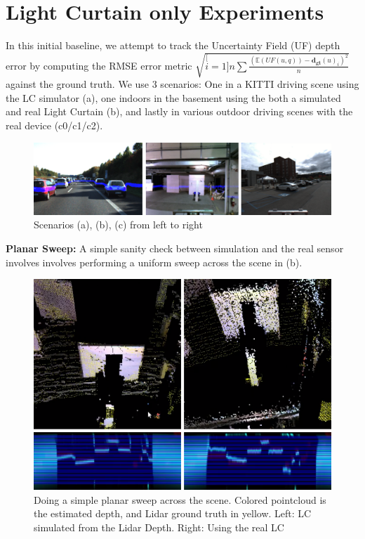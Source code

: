 
\section{Light Curtain only Experiments}

In this initial baseline, we attempt to track the Uncertainty Field (UF) depth error by computing the RMSE error metric $\sqrt{\stackrel[i=1]{n}{\sum}\frac{\left(\mathbb{E}\left(UF\left(u,q\right)\right)-\mathbf{d_{gt}}(u)_{i}\right)^{2}}{n}}$ against the ground truth. We use 3 scenarios: One in a KITTI driving scene using the LC simulator (a), one indoors in the basement using the both a simulated and real Light Curtain (b), and lastly in various outdoor driving scenes with the real device (c0/c1/c2). 

\begin{figure}[h]
   \centering
   \begin{minipage}{0.5\textwidth}
       \centering
       \includegraphics[width=1.0\textwidth]{figures/exp.png}
   \end{minipage}\hfill
   \centering
   \caption{Scenarios (a), (b), (c) from left to right}
   \label{fig:exp}
\end{figure}

\textbf{Planar Sweep:} A simple sanity check between simulation and the real sensor involves involves performing a uniform sweep across the scene in (b). 

\begin{figure}
   \centering
   \begin{minipage}{0.4\textwidth}
       \centering
       \includegraphics[width=1.0\textwidth]{figures/sweep.png}
   \end{minipage}\hfill
   \centering
   \caption{Doing a simple planar sweep across the scene. Colored pointcloud is the estimated depth, and Lidar ground truth in yellow. Left: LC simulated from the Lidar Depth. Right: Using the real LC}
   \label{fig:planarsweep}
\end{figure}

